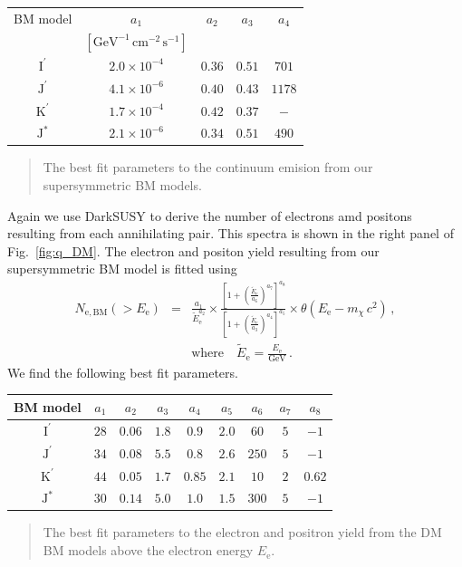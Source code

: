 \documentclass[10pt,aps,pra,reprint,amsmath,amsfonts,amssymb,showpacs,nofootinbib,floatfix]{revtex4-1}
\newcommand{\rmn}{\mathrm}
\newcommand{\ee}{E_\rmn{e}}
\newcommand{\Kp}{\rmn{K}^\prime}
\newcommand{\Ip}{\rmn{I}^\prime}
\newcommand{\Js}{\rmn{J}^*}
\newcommand{\Jp}{\rmn{J}^\prime}
\newcommand{\cm}{\rmn{cm}}
\newcommand{\eet}{\tilde{E}_\rmn{e}}
\newcommand{\gev}{\rmn{GeV}}
\newcommand{\e}{\rmn{e}}
\begin{document}
\begin{table}
\begin{tabular}{c c c c c }
\hline
\hline
 BM model & $a_1$ & $a_2$  & $a_3$ & $a_4$ \\
          & $[\gev^{-1}\,\cm^{-2}\,\rmn{s}^{-1}]$ & & & \\
 \hline
$\Ip$ & $2.0\times10^{-4}$ & $0.36$ & $0.51$ & $701$  \\
$\Jp$ & $4.1\times10^{-6}$ & $0.40$ & $0.43$ & $1178$ \\
$\Kp$ & $1.7\times10^{-4}$ & $0.42$ & $0.37$ & $-$    \\
$\Js$ & $2.1\times10^{-6}$ & $0.34$ & $0.51$ & $490$  \\
\hline
\hline
\end{tabular}
\begin{quote}
The best fit parameters to the continuum emision from our
supersymmetric BM models.
 \label{tab:bm_cont}
  \end{quote}
\end{table} 
Again we use {\sc DarkSUSY} to derive the number of electrons amd
positons resulting from each annihilating pair. This spectra is shown
in the right panel of Fig.~\ref{fig:q_DM}. The electron and positon
yield resulting from our supersymmetric BM model is fitted using
\begin{eqnarray}
N_{\e,\rmn{BM}}(>\ee) &=& \frac{a_1}{\eet^{a_2}}\times
\frac{\left[1+\left(\frac{\eet}{a_6}\right)^{a_7}\right]^{a_8}}
{\left[1+\left(\frac{\eet}{a_3}\right)^{a_4}\right]^{a_5}}
\times\theta(\ee-m_\chi\,c^2)\,,\nonumber\\
& &\rmn{where}\quad\eet=\frac{\ee}{\gev}\,.
\label{eq:bm_elec}
\end{eqnarray}
We find the following best fit parameters.
\begin{table}
\begin{tabular}{c c c c c c c c c}
\hline
\hline
 BM model & $a_1$ & $a_2$ & $a_3$ & $a_4$ & $a_5$ & $a_6$ & $a_7$ & $a_8$ \\
 \hline
$\Ip$ & $28$ & $0.06$ & $1.8$ & $0.9$  & $2.0$ & $60$  & $5$ & $-1$     \\
$\Jp$ & $34$ & $0.08$ & $5.5$ & $0.8$  & $2.6$ & $250$ & $5$ & $-1$     \\
$\Kp$ & $44$ & $0.05$ & $1.7$ & $0.85$ & $2.1$ & $10$  & $2$ & $0.62$   \\
$\Js$ & $30$ & $0.14$ & $5.0$ & $1.0$  & $1.5$ & $300$ & $5$ & $-1$     \\
\hline
\hline
\end{tabular}
\begin{quote}
The best fit parameters to the electron and positron yield from the DM
BM models above the electron energy $\ee$.
 \label{tab:bm_elec}
  \end{quote}
\end{table} 
\end{document}
